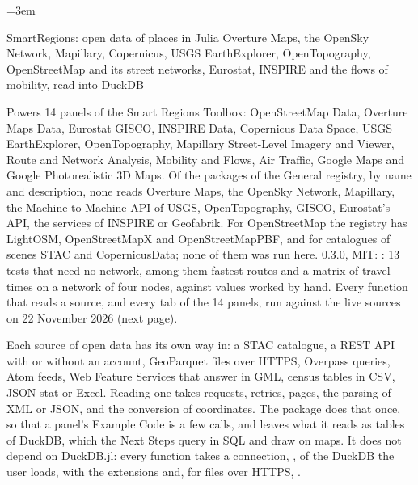 \emergencystretch=3em

  {SmartRegions: open data of places in Julia}
  {Overture Maps, the OpenSky Network, Mapillary, Copernicus, USGS EarthExplorer, OpenTopography, OpenStreetMap and
   its street networks, Eurostat, INSPIRE and the flows of mobility, read into DuckDB}

\factsheet
  {Powers 14 panels of the Smart Regions Toolbox: OpenStreetMap Data, Overture Maps Data, Eurostat GISCO, INSPIRE Data,
   Copernicus Data Space, USGS EarthExplorer, OpenTopography, Mapillary Street-Level Imagery and Viewer, Route and Network
   Analysis, Mobility and Flows, Air Traffic, Google Maps and Google Photorealistic 3D Maps.}
  {Of the packages of the General registry, by name and description, none reads Overture Maps, the OpenSky Network,
   Mapillary, the Machine-to-Machine API of USGS, OpenTopography, GISCO, Eurostat's API, the services of INSPIRE or
   Geofabrik. For OpenStreetMap the registry has LightOSM, OpenStreetMapX and OpenStreetMapPBF, and for catalogues of
   scenes STAC and CopernicusData; none of them was run here.}
  { 0.3.0, MIT:\newline
   \newline {}}
  {: 13 tests that need no network, among them fastest routes and a matrix of travel times on a
   network of four nodes, against values worked by hand. Every function that reads a source, and every tab of the 14
   panels, run against the live sources on 22 November 2026 (next page).}

Each source of open data has its own way in: a STAC catalogue, a REST API with or without an account, GeoParquet files
over HTTPS, Overpass queries, Atom feeds, Web Feature Services that answer in GML, census tables in CSV, JSON-stat or
Excel. Reading one takes requests, retries, pages, the parsing of XML or JSON, and the conversion of coordinates. The
package does that once, so that a panel's Example Code is a few calls, and leaves what it reads as tables of DuckDB,
which the Next Steps query in SQL and draw on maps. It does not depend on DuckDB.jl: every function takes a connection,
, of the DuckDB the user loads, with the extensions  and, for files over HTTPS, .

